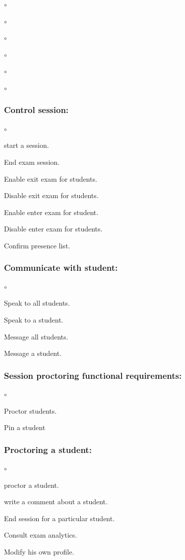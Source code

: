 \documentclass[]{uc2pfecaneva}
\begin{document}
\begin{list}{$\circ$}{}
\begin{list}{$\circ$}{}
\begin{list}{$\circ$}{}
\begin{list}{$\circ$}{}
\begin{list}{$\circ$}{}
\begin{list}{$\circ$}{}
            \subsubsection{Control session:}
            \begin{list}{$\circ$}{}
                \item start a session.
                \item End exam session.
                \item Enable exit exam for students.
                \item Disable exit exam for students.
                \item Enable enter exam for student.
                \item Disable enter exam for students.
                \item Confirm presence list.
            \end{list}
            \subsubsection{Communicate with student:}
            \begin{list}{$\circ$}{}
                \item Speak to all students.
                \item Speak to a student.
                \item Message all students.
                \item Message a student.
            \end{list}
            \subsubsection{Session proctoring functional requirements:}
            \begin{list}{$\circ$}{}
                \item Proctor students.
                \item Pin a student
                \subsubsection{Proctoring a student:}
                \begin{list}{$\circ$}{}
                    \item proctor a student.
                    \item write a comment about a student.
                    \item End session for a particular student.
                \end{list}
            \end{list}
            \item Consult exam analytics.
        \end{list}
        \item Modify his own profile.
    \end{list}



\end{list}
\end{list}
\end{list}
\end{list}
\end{document}
